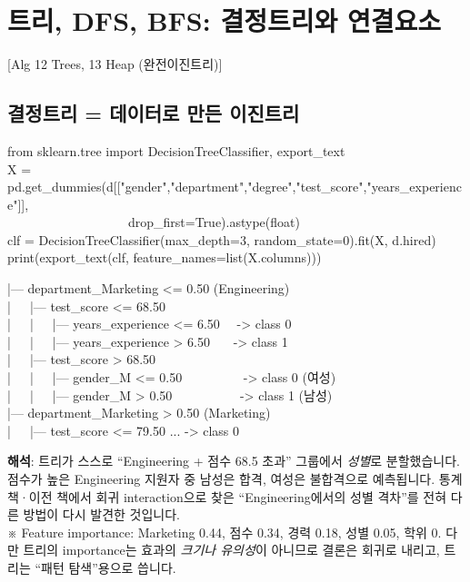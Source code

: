 \documentclass[11pt,a4paper]{article}
\newcommand{\aref}[1]{{\footnotesize\textsf{\color{blue!55!black}[Alg #1]}}}
\newcommand{\aside}[1]{{\footnotesize\color{black!65}#1}}
\begin{document}
\section{트리, DFS, BFS: 결정트리와 연결요소}
\aref{12 Trees, 13 Heap (완전이진트리)}

\subsection{결정트리 = 데이터로 만든 이진트리}
\begin{codebox}
from sklearn.tree import DecisionTreeClassifier, export\_text\\
X = pd.get\_dummies(d[["gender","department","degree","test\_score","years\_experience"]],\\
\ \ \ \ \ \ \ \ \ \ \ \ \ \ \ \ \ \ \ drop\_first=True).astype(float)\\
clf = DecisionTreeClassifier(max\_depth=3, random\_state=0).fit(X, d.hired)\\
print(export\_text(clf, feature\_names=list(X.columns)))
\end{codebox}
\begin{codebox}
|--- department\_Marketing <= 0.50 \hfill (Engineering)\\
|\ \ \ |--- test\_score <= 68.50\\
|\ \ \ |\ \ \ |--- years\_experience <= 6.50 \ \ -> class 0\\
|\ \ \ |\ \ \ |--- years\_experience > 6.50 \ \ \ -> class 1\\
|\ \ \ |--- test\_score > 68.50\\
|\ \ \ |\ \ \ |--- gender\_M <= 0.50 \ \ \ \ \ \ \ \ \ -> class 0 \hfill (여성)\\
|\ \ \ |\ \ \ |--- gender\_M > 0.50 \ \ \ \ \ \ \ \ \ \ -> class 1 \hfill (남성)\\
|--- department\_Marketing > 0.50 \hfill (Marketing)\\
|\ \ \ |--- test\_score <= 79.50 ... -> class 0
\end{codebox}
\textbf{해석}: 트리가 스스로 ``Engineering + 점수 68.5 초과'' 그룹에서 \emph{성별}로 분할했습니다. 점수가 높은 Engineering 지원자 중 남성은 합격, 여성은 불합격으로 예측됩니다. 통계책·이전 책에서 회귀 interaction으로 찾은 ``Engineering에서의 성별 격차''를 전혀 다른 방법이 다시 발견한 것입니다.\\
\aside{※ Feature importance: Marketing 0.44, 점수 0.34, 경력 0.18, 성별 0.05, 학위 0. 다만 트리의 importance는 효과의 \emph{크기나 유의성}이 아니므로 결론은 회귀로 내리고, 트리는 ``패턴 탐색''용으로 씁니다.}
\end{document}
